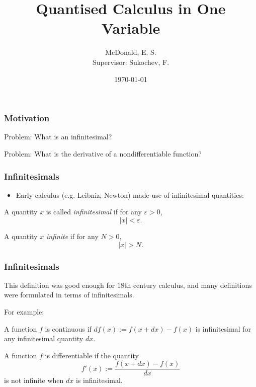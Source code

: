 \documentclass{beamer}
\title[Quantised Calculus]{Quantised Calculus in One Variable}
\author[McDonald, E.]{McDonald, E. S. \\Supervisor: Sukochev, F.}
\institute[UNSW] { UNSW Australia }
\date{\today}
\begin{document}
 


\begin{frame} 
\titlepage 
\end{frame} %



\begin{frame} 

\frametitle{Motivation} 

\begin{block}
{Problem:}
What is an infinitesimal?
\end{block}
\begin{block} 
{Problem:}
What is the derivative of a nondifferentiable function?
\end{block}

\end{frame} 

\begin{frame} 
\frametitle{Infinitesimals} 
\begin{itemize}
    \item{} Early calculus (e.g. Leibniz, Newton) made use of infinitesimal quantities:
\end{itemize}
\begin{definition}
    A quantity $x$ is called \emph{infinitesimal} if for any $\varepsilon > 0$,
    \begin{equation*}
        |x| < \varepsilon.
    \end{equation*}
\end{definition}
\begin{definition}
    A quantity $x$ \emph{infinite} if for any $N > 0$, 
    \begin{equation*}
        |x| > N.
    \end{equation*}
\end{definition}
\end{frame} 

\begin{frame} 
\frametitle{Infinitesimals}
This definition was good enough for $18$th century calculus, and many
definitions were formulated in terms of infinitesimals.

For example:
\begin{definition}
    A function $f$ is continuous if $df(x) := f(x+dx)-f(x)$ is infinitesimal
    for any infinitesimal quantity $dx$.
\end{definition}
\begin{definition}
    A function $f$ is differentiable if the quantity
    \begin{equation*}
        f'(x) := \frac{f(x+dx)-f(x)}{dx}
    \end{equation*}
    is not infinite when $dx$ is infinitesimal.
\end{definition}
\end{frame}
\end{document}
